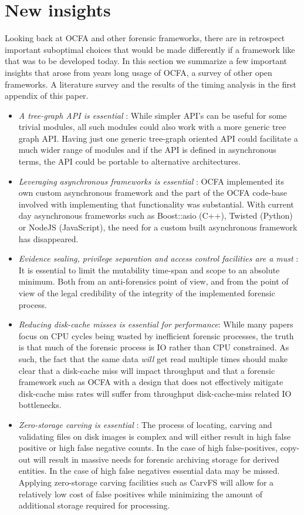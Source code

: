 \section{New insights}
Looking back at OCFA and other forensic frameworks, there are in retrospect important suboptimal choices that would be made differently if a framework like that was to be developed today. In this section we summarize a few important insights that arose from years long usage of OCFA, a survey of other open frameworks. A literature survey and the results of the timing analysis in the first appendix of this paper.
\begin{itemize}
\item \emph{A tree-graph API is essential} : While simpler API's can be useful for some trivial modules, all such modules could also work with a more generic tree graph API. Having just one generic tree-graph oriented API could facilitate a much wider range of modules and if the API is defined in asynchronous terms, the API could be portable to alternative architectures.
\item \emph{Leveraging asynchronous frameworks is essential} : OCFA implemented its own custom asynchronous framework and the part of the OCFA code-base involved with implementing that functionality was substantial. With current day asynchronous frameworks such as Boost::asio (C++), Twisted (Python) or NodeJS (JavaScript), the need for a custom built asynchronous framework has disappeared.
\item \emph{Evidence sealing, privilege separation and access control facilities are a must} : It is essential to limit the mutability time-span and scope to an absolute minimum. Both from an anti-forensics point of view, and from the point of view of the legal credibility of the integrity of the implemented forensic process.
\item \emph{Reducing disk-cache misses is essential for performance}: While many papers focus on CPU cycles being wasted by inefficient forensic processes, the truth is that much of the forensic process is IO rather than CPU constrained. As such, the fact that the same data \emph{will} get read multiple times should make clear that a disk-cache miss will impact throughput and that a forensic framework such as OCFA with a design that does not effectively mitigate disk-cache miss rates will suffer from throughput disk-cache-miss related IO bottlenecks.
\item \emph{Zero-storage carving is essential} : The process of locating, carving and validating files on disk images is complex and will either result in high false positive or high false negative counts. In the case of high false-positives, copy-out will result in massive needs for forensic archiving storage for derived entities. In the case of high false negatives essential data may be missed. Applying zero-storage carving facilities such as CarvFS will allow for a relatively low cost of false positives while minimizing the amount of additional storage required for processing.

\end{itemize}
